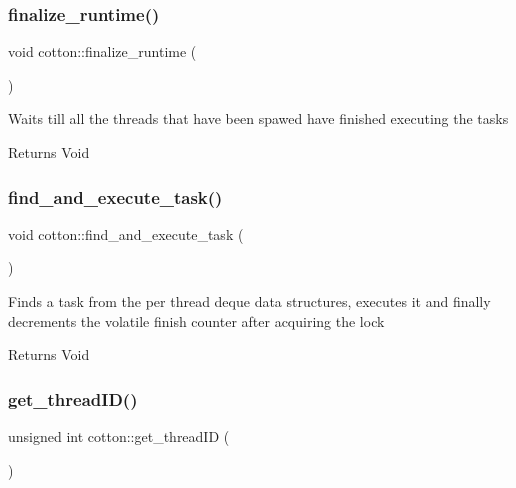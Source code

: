 \subsubsection{\texorpdfstring{finalize\+\_\+runtime()}{finalize\_runtime()}}
{\footnotesize\ttfamily void cotton\+::finalize\+\_\+runtime (\begin{DoxyParamCaption}{ }\end{DoxyParamCaption})}

Waits till all the threads that have been spawed have finished executing the tasks

\begin{DoxyReturn}{Returns}
Void 
\end{DoxyReturn}
\mbox{\label{namespacecotton_af22caee9434a7e06a09b2f9a0417c1eb}} 
\subsubsection{\texorpdfstring{find\+\_\+and\+\_\+execute\+\_\+task()}{find\_and\_execute\_task()}}
{\footnotesize\ttfamily void cotton\+::find\+\_\+and\+\_\+execute\+\_\+task (\begin{DoxyParamCaption}{ }\end{DoxyParamCaption})}

Finds a task from the per thread deque data structures, executes it and finally decrements the volatile finish counter after acquiring the lock

\begin{DoxyReturn}{Returns}
Void 
\end{DoxyReturn}
\mbox{\label{namespacecotton_ab1ebe1f6821a54e7c4911c22acebff8a}} 
\subsubsection{\texorpdfstring{get\+\_\+thread\+I\+D()}{get\_threadID()}}
{\footnotesize\ttfamily unsigned int cotton\+::get\+\_\+thread\+ID (\begin{DoxyParamCaption}{ }\end{DoxyParamCaption})}

